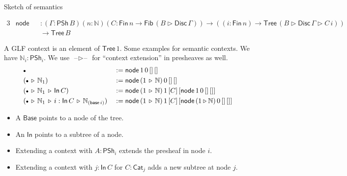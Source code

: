 \documentclass[dvipsnames,aspectratio=169]{beamer}
\newcommand{\ms}[1]{\mathsf{#1}}
\newcommand{\mbb}[1]{\mathbb{#1}}
\newcommand{\blank}{\mathord{\hspace{1pt}\text{--}\hspace{1pt}}}
\newcommand{\Fib}{\mathsf{Fib}}
\newcommand{\Fin}{\mathsf{Fin}}
\newcommand{\Tree}{\mathsf{Tree}}
\newcommand{\Disc}{\mathsf{Disc}}
\newcommand{\Base}{\mathsf{Base}}
\newcommand{\In}{\mathsf{In}}
\newcommand{\PSh}{\mathsf{PSh}}
\newcommand{\Cat}{\mathsf{Cat}}
\newcommand{\base}{\mathsf{base}}
\newcommand{\ext}{\triangleright}
\newcommand{\emptycon}{\scaleobj{.75}\bullet}
\begin{document}
\begin{frame}{Sketch of semantics}

\begin{block}{}
\vspace{-1em}
{\small
\begin{alignat*}{3}
  & \ms{node} &&: (\Gamma : \PSh\,B)(n : \mbb{N})(C : \Fin\,n \to \Fib\,(B \ext \Disc\,\Gamma)) \to ((i : \Fin\,n) \to \Tree\,(B \ext \Disc\,\Gamma \ext C\,i)) \\
  & &&\to \Tree\,B
\end{alignat*}
}
\end{block}
\vspace{0.5em}

A GLF context is an element of $\Tree\,1$. Some examples for semantic contexts. We have $\mbb{N}_i : \PSh_i$. We use $\blank\ext\blank$ for ``context extension'' in presheaves as well.
\begin{alignat*}{3}
  & \emptycon &&:= \ms{node}\,1\,0\,[]\,[]\\
  & (\emptycon\,\ext\,\mbb{N}_1) &&:= \ms{node}\,(1\,\ext\,\mbb{N})\,0\,[]\,[]\\
  & (\emptycon\,\ext\,\mbb{N}_1\,\ext\,\In\,C) &&:= \ms{node}\,(1\,\ext\,\mbb{N})\,1\,[C]\,[\ms{node}\,1\,0\,[]\,[]]\\
  & (\emptycon\,\ext\,\mbb{N}_1\,\ext\,i : \In\,C\,\ext\,\mbb{N}_{(\base\,i)}) &&:= \ms{node}\,(1\,\ext\,\mbb{N})\,1\,[C]\,[\ms{node}\,(1 \ext \mbb{N})\,0\,[]\,[]]
\end{alignat*}
\vspace{-1em}
\pause

\begin{itemize}
\item A $\Base$ points to a node of the tree.
\item An $\In$ points to a subtree of a node.
\item Extending a context with $A : \PSh_i$ extends the presheaf in node $i$.
\item Extending a context with $j : \In\,C$ for $C : \Cat_j$ adds a new subtree at node $j$.
\end{itemize}


\end{frame}
\end{document}
